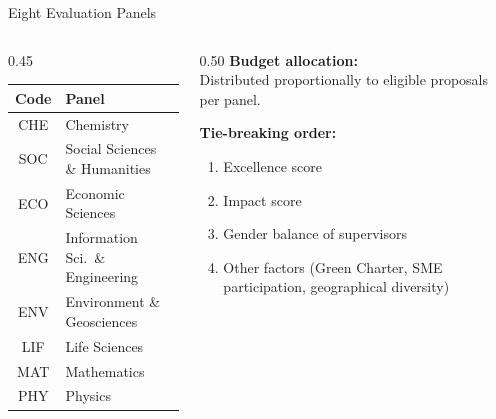 \documentclass[aspectratio=169]{beamer}
\begin{document}
\begin{frame}{Eight Evaluation Panels}
\begin{columns}[T]
\begin{column}{0.45\textwidth}
\renewcommand{\arraystretch}{1.2}
\begin{tabular}{@{}c l@{}}
  \toprule
  \textbf{Code} & \textbf{Panel} \\
  \midrule
  CHE & Chemistry \\
  \rowcolor{euLightBlue}
  SOC & Social Sciences \& Humanities \\
  ECO & Economic Sciences \\
  \rowcolor{euLightBlue}
  ENG & Information Sci.\ \& Engineering \\
  ENV & Environment \& Geosciences \\
  \rowcolor{euLightBlue}
  LIF & Life Sciences \\
  MAT & Mathematics \\
  \rowcolor{euLightBlue}
  PHY & Physics \\
  \bottomrule
\end{tabular}
\end{column}
\begin{column}{0.50\textwidth}
\textbf{Budget allocation:}\\
Distributed proportionally to eligible proposals per panel.

\vspace{8pt}
\textbf{Tie-breaking order:}
\begin{enumerate}
  \item Excellence score
  \item Impact score
  \item Gender balance of supervisors
  \item Other factors (Green Charter, SME participation, geographical diversity)
\end{enumerate}
\end{column}
\end{columns}
\end{frame}
\end{document}
